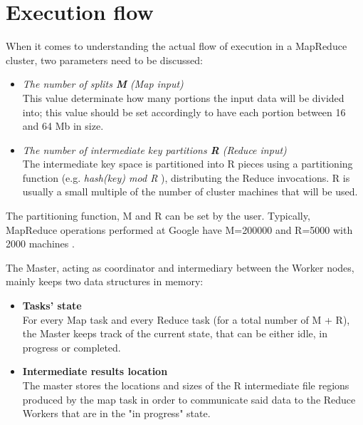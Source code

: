 \section{Execution flow}
When it comes to understanding the actual flow of execution in a MapReduce cluster, two parameters need to be discussed:
\begin{itemize}
    \item \textit{The number of splits \textbf{M} (Map input)}\\
    This value determinate how many portions the input data will be divided into; this value should be set accordingly to have each portion between 16 and 64 Mb in size.
    \item \textit{The number of intermediate key partitions \textbf{R} (Reduce input)}\\
    The intermediate key space is partitioned into R pieces using a partitioning function (e.g. \textit{hash(key) mod R} \cite{google_mapreduce}), distributing the Reduce invocations. R is usually a small multiple of the number of cluster machines that will be used.
\end{itemize}
The partitioning function, M and R can be set by the user. Typically, MapReduce operations performed at Google have M=200000 and R=5000 with 2000 machines \cite{google_mapreduce}.

The Master, acting as coordinator and intermediary between the Worker nodes, mainly keeps two data structures in memory:
\begin{itemize}
    \item \textbf{Tasks' state}\\
    For every Map task and every Reduce task (for a total number of M + R), the Master keeps track of the current state, that can be either idle, in progress or completed.
    \item \textbf{Intermediate results location}\\
    The master stores the locations and sizes of the R intermediate file regions produced by the map task in order to communicate said data to the Reduce Workers that are in the "in progress" state.
\end{itemize}

